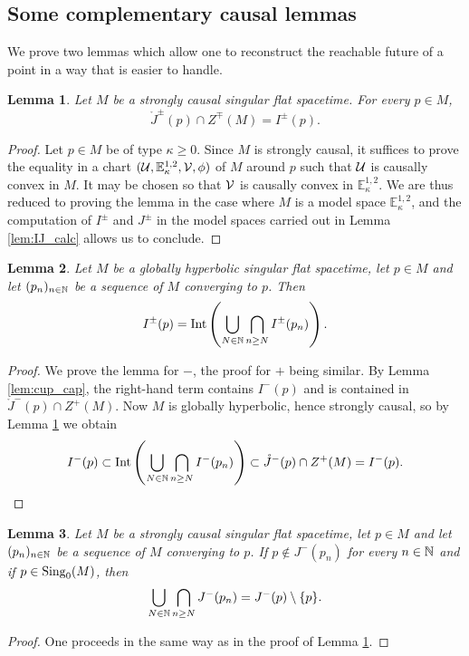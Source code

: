 \documentclass[a4paper,twoside]{article}
\newcommand{\mass}[1]{\mathbb{E}^{1,2}_{#1}}
\newtheorem{lem}{Lemma}[section]
\begin{document}
\subsection{Some complementary causal lemmas}
We prove two lemmas which allow one to reconstruct the reachable future of a point in a way that is easier to handle.
\begin{lem}\label{lem:J_int}
Let $M$ be a strongly causal singular flat spacetime.
For every $p\in M$,
$$\ring J^\pm(p)\cap Z^\mp(M)=I^\pm(p).$$
\end{lem}
\begin{proof} Let $p\in M$ be of type $\kappa\geq 0$. Since $M$ is strongly causal, it suffices to prove the equality in a chart
$(\U,\mass{\kappa},\V,\phi)$ of $M$ around $p$ such that $\mathcal{U}$ is causally convex in $M$. It may be chosen so that
$\mathcal V$ is causally convex in $\mass{\kappa}$. We are thus reduced to proving the lemma in the case where $M$
is a model space
$\mass{\kappa}$, and the computation of $I^\pm$ and $J^\pm$ in the model spaces carried out in Lemma \ref{lem:IJ_calc} allows us to conclude.
\end{proof}

\begin{lem}\label{lem:cup_cap_sing}
Let $M$ be a globally hyperbolic singular flat spacetime, let
$p\in M$ and let $(p_n)_{n\in \mathbb{N}}$ be a sequence of $M$ converging to $p$.
Then
$$I^{\pm}(p)=\mathrm{Int}\left(\bigcup_{N\in \mathbb{N}}\bigcap_{n\geq N} I^\pm(p_n)\right).$$
\end{lem}
\begin{proof} We prove the lemma for $-$, the proof for $+$ being similar.
By Lemma \ref{lem:cup_cap}, the right-hand term contains $I^-(p)$ and is contained
in $\ring J^-(p)\cap Z^+(M)$.
Now $M$ is globally hyperbolic, hence strongly causal, so by Lemma \ref{lem:J_int} we obtain
$$I^{-}(p)\subset \mathrm{Int}\left(\bigcup_{N\in \N}\bigcap_{n\geq N} I^-(p_n)\right) \subset \ring J^-(p)\cap Z^+(M) = I^-(p).$$
\end{proof}

\begin{lem}\label{lem:cup_cap_BTZ}
Let $M$ be a strongly causal singular flat spacetime, let
$p\in M$ and let $(p_n)_{n\in \mathbb{N}}$ be a sequence of $M$ converging to $p$.
If $p \notin J^-(p_n)$ for every $n\in \mathbb{N}$ and if $p\in \mathrm{Sing}_0(M)$, then
$$\bigcup_{N\in \mathbb{N}}\bigcap_{n\geq N} J^-(p_n)=J^-(p)\setminus \{p\}.$$
\end{lem}
\begin{proof}
One proceeds in the same way as in the proof of Lemma \ref{lem:J_int}.
\end{proof}
\end{document}
